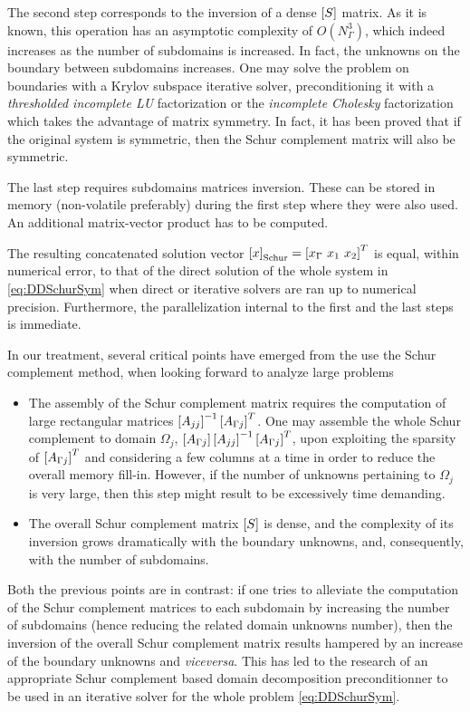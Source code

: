 The second step corresponds to the inversion of a dense $\left[S\right]$ matrix. As it is known, this operation has an asymptotic complexity of $O(N_\Gamma^3)$, which indeed increases as the number of subdomains is increased. In fact, the unknowns on the boundary between subdomains increases. One may solve the problem on boundaries with a Krylov subspace iterative solver, preconditioning it with a \textit{thresholded incomplete LU} factorization  \cite{saad1994ilut} or the \textit{incomplete Cholesky} factorization which takes the advantage of matrix symmetry. In fact, it has been proved \cite{mathew2008domain} that if the original system is symmetric, then the Schur complement matrix will also be symmetric.

The last step requires subdomains matrices inversion. These can be stored in memory (non-volatile preferably) during the first step where they were also used. An additional matrix-vector product has to be computed.

The resulting concatenated solution vector $\vect{x}_\mathrm{Schur} = \vect{x_\Gamma \ x_1 \ x_2}^T$ is equal, within numerical error, to that of the direct solution of the whole system in \eqref{eq:DDSchurSym} when direct or iterative solvers are ran up to numerical precision. Furthermore, the parallelization internal to the first and the last steps is immediate.

In our treatment, several critical points have emerged from the use the Schur complement method, when looking forward to analyze large problems

\begin{itemize}
\item The assembly of the Schur complement matrix requires the computation of large rectangular matrices $\left[A_{jj}\right]^{-1} \left[A_{\Gamma j}\right]^T$. One may assemble the whole Schur complement to domain $\Omega_j$, $\left[A_{\Gamma j}\right] \left[A_{jj}\right]^{-1} \left[A_{\Gamma j}\right]^T$, upon exploiting the sparsity of $\left[A_{\Gamma j}\right]^T$ and considering a few columns at a time in order to reduce the overall memory fill-in. However, if the number of unknowns pertaining to $\Omega_j$ is very large, then this step might result to be excessively time demanding.
\item The overall Schur complement matrix $\left[S\right]$ is dense, and the complexity of its inversion grows dramatically with the boundary unknowns, and, consequently, with the number of subdomains.
\end{itemize}

\noindent Both the previous points are in contrast: if one tries to alleviate the computation of the Schur complement matrices to each subdomain by increasing the number of subdomains (hence reducing the related domain unknowns number), then the inversion of the overall Schur complement matrix results hampered by an increase of the boundary unknowns and \textit{viceversa}. This has led to the research of an appropriate Schur complement based domain decomposition preconditionner to be used in an iterative solver for the whole problem \eqref{eq:DDSchurSym}.

